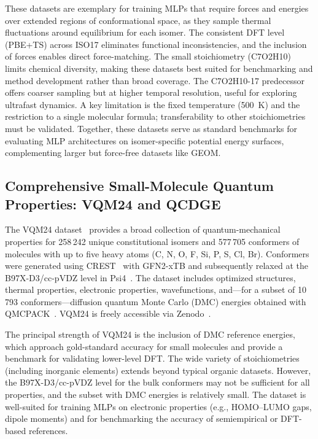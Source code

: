 \documentclass[12pt]{article}
\begin{document}
These datasets are exemplary for training MLPs that require forces and energies over extended regions of conformational space, as they sample thermal fluctuations around equilibrium for each isomer. The consistent DFT level (PBE+TS) across ISO17 eliminates functional inconsistencies, and the inclusion of forces enables direct force-matching. The small stoichiometry (C7O2H10) limits chemical diversity, making these datasets best suited for benchmarking and method development rather than broad coverage. The C7O2H10-17 predecessor offers coarser sampling but at higher temporal resolution, useful for exploring ultrafast dynamics. A key limitation is the fixed temperature (500~K) and the restriction to a single molecular formula; transferability to other stoichiometries must be validated. Together, these datasets serve as standard benchmarks for evaluating MLP architectures on isomer-specific potential energy surfaces, complementing larger but force-free datasets like GEOM.

\subsection{Comprehensive Small-Molecule Quantum Properties: VQM24 and QCDGE}
\label{sec:comprehensive}

The VQM24 dataset~\cite{ds39-49} provides a broad collection of quantum-mechanical properties for 258\,242 unique constitutional isomers and 577\,705 conformers of molecules with up to five heavy atoms (C, N, O, F, Si, P, S, Cl, Br). Conformers were generated using CREST~\cite{ds39-164} with GFN2-xTB and subsequently relaxed at the B97X-D3/cc-pVDZ level in Psi4~\cite{ds39-99}. The dataset includes optimized structures, thermal properties, electronic properties, wavefunctions, and—for a subset of 10\,793 conformers—diffusion quantum Monte Carlo (DMC) energies obtained with QMCPACK~\cite{ds39-174}. VQM24 is freely accessible via Zenodo~\cite{ds39-186}.

The principal strength of VQM24 is the inclusion of DMC reference energies, which approach gold-standard accuracy for small molecules and provide a benchmark for validating lower-level DFT. The wide variety of stoichiometries (including inorganic elements) extends beyond typical organic datasets. However, the B97X-D3/cc-pVDZ level for the bulk conformers may not be sufficient for all properties, and the subset with DMC energies is relatively small. The dataset is well-suited for training MLPs on electronic properties (e.g., HOMO–LUMO gaps, dipole moments) and for benchmarking the accuracy of semiempirical or DFT-based references.
\end{document}
